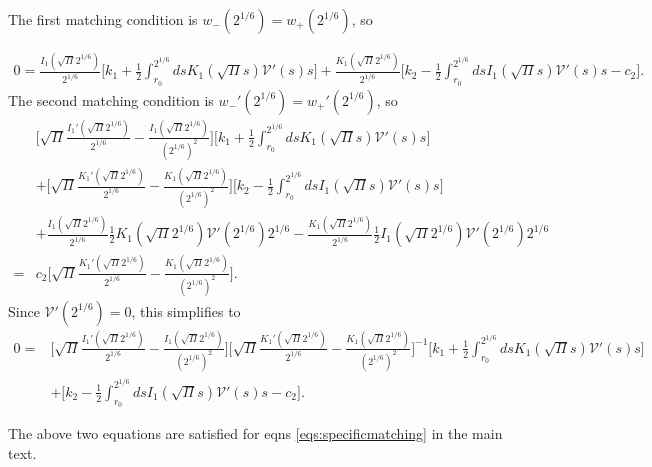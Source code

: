 \documentclass[../main.tex]{subfiles}
\begin{document}
The first matching condition is $w_{-}(2^{1/6})=w_{+}(2^{1/6})$, so
\begin{widetext}
  \begin{align}
    0=\frac{I_1(\sqrt{\Pi}2^{1/6})}{2^{1/6}}\bigg[
      k_1 + \frac{1}{2}\int_{r_0}^{2^{1/6}}dsK_1(\sqrt{\Pi}s)
      \mathcal{V}'(s)s\bigg]
    +\frac{K_1(\sqrt{\Pi}2^{1/6})}{2^{1/6}}
    \bigg[k_2 - \frac{1}{2}\int_{r_0}^{2^{1/6}}dsI_1(\sqrt{\Pi}s)
      \mathcal{V}'(s)s-c_2\bigg].
  \end{align}
  The second matching condition is $w_{-}'(2^{1/6})=w_{+}'(2^{1/6})$, so
  \begin{align}
    &\bigg[\sqrt{\Pi}\frac{I_1'(\sqrt{\Pi}2^{1/6})}{2^{1/6}}
    -\frac{I_1(\sqrt{\Pi}2^{1/6})}{(2^{1/6})^2}\bigg]
    \bigg[k_1 + \frac{1}{2}\int_{r_0}^{2^{1/6}}dsK_1(\sqrt{\Pi}s)
      \mathcal{V}'(s)s\bigg]\nonumber\\
    &+\bigg[\sqrt{\Pi}\frac{K_1'(\sqrt{\Pi}2^{1/6})}{2^{1/6}}
      -\frac{K_1(\sqrt{\Pi}2^{1/6})}{(2^{1/6})^2}\bigg]
    \bigg[k_2 - \frac{1}{2}\int_{r_0}^{2^{1/6}}dsI_1(\sqrt{\Pi}s)
      \mathcal{V}'(s)s\bigg]\nonumber\\
  &+\frac{I_1(\sqrt{\Pi}2^{1/6})}{2^{1/6}}\frac{1}{2}K_1(\sqrt{\Pi}2^{1/6})
      \mathcal{V}'(2^{1/6})2^{1/6}
  -\frac{K_1(\sqrt{\Pi}2^{1/6})}{2^{1/6}}\frac{1}{2}I_1(\sqrt{\Pi}2^{1/6})
  \mathcal{V}'(2^{1/6})2^{1/6}\nonumber\\
  =&c_2\bigg[\sqrt{\Pi}\frac{K_1'(\sqrt{\Pi}2^{1/6})}{2^{1/6}}
  -\frac{K_1(\sqrt{\Pi}2^{1/6})}{(2^{1/6})^2}\bigg].
  \end{align}
  Since $\mathcal{V}'(2^{1/6})=0$, this simplifies to
  \begin{align}
    0=&\bigg[\sqrt{\Pi}\frac{I_1'(\sqrt{\Pi}2^{1/6})}{2^{1/6}}
      -\frac{I_1(\sqrt{\Pi}2^{1/6})}{(2^{1/6})^2}\bigg]
    \bigg[\sqrt{\Pi}\frac{K_1'(\sqrt{\Pi}2^{1/6})}{2^{1/6}}
      -\frac{K_1(\sqrt{\Pi}2^{1/6})}{(2^{1/6})^2}\bigg]^{-1}
    \bigg[k_1 + \frac{1}{2}\int_{r_0}^{2^{1/6}}dsK_1(\sqrt{\Pi}s)
      \mathcal{V}'(s)s\bigg]\nonumber\\
    &+\bigg[k_2 - \frac{1}{2}\int_{r_0}^{2^{1/6}}dsI_1(\sqrt{\Pi}s)
      \mathcal{V}'(s)s-c_2\bigg].
  \end{align}
\end{widetext}
The above two equations are satisfied for eqns \ref{eqs:specificmatching}
in the main text.
\pagebreak
\end{document}
